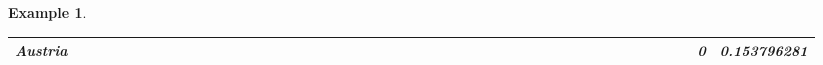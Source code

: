 \documentclass[a4paper,11pt]{report}
\newtheorem{example}[theorem]{Example}
\begin{document}
\begin{example}
\begin{appendices}
\begin{landscape}
\begin{longtable}{r|r|r|r|r|r|r|r|r|r|r|r|r|r|r|r|r|r|r|r|r|r|r|r|r|r|r|r|r|r|r|r|r|r|r|r|r|r|r|r|r|r|r|r|r|r|r|}
\multicolumn{1}{|r|}{\textbf{Austria}}               &                                       &                                       &                                          &                                       &                                       &                                                     &                                        &                                       &                                      &                                       &                                       &                                                &                                       &                                      &                                       &                                       &                                      &                                       &                                       &                                       &                                      &                                     &                                      &                                         &                                     &                                       &                                          &                                      &                                        &                                       &                                      &                                          &                                      &                                        &                                        &                                     &                                      &                                           &                                               &                                      &                                       &                                              &                                      &                                     & 0                                             & 0.153796281                             \\ \hline

\end{longtable}
\end{landscape}
\end{appendices}
\end{example}
\end{document}
